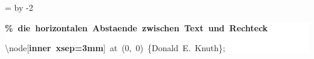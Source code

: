 \begingroup
\ttfamily
{}
=\textwidth
\advance{} by -2\fboxsep
\noindent
\colorbox{background}
{%
\parbox{\dimen255}
{%
\rule[-0.5ex]{0pt}{2.5ex}\hspace*{0.0em}\textcolor{G}{\textbf{\%~die~horizontalen~Abstaende~zwischen~Text~und~Rechteck}}\\
\rule[-0.5ex]{0pt}{2.5ex}\hspace*{0.0em}\textbackslash{}node[\textcolor{R}{\textbf{inner~xsep=3mm}}]~at~(0,~0)~\{Donald~E.~Knuth\};}%
}%
\endgroup
